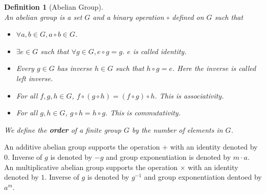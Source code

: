 \documentclass[12pt]{article}
\newtheorem{definition}{Definition}[section]
\theoremstyle{definition}
\begin{document}
\begin{definition}[Abelian Group]
\hfill\\\normalfont An abelian group is a set $G$ and a binary operation $\circ$ defined on $G$ such that
\begin{itemize}
  \item $\forall a, b\in G, a\circ b \in G$.
  \item $\exists e\in G$ such that $\forall g\in G, e\circ g=g$. $e$ is called identity.
  \item Every $g\in G$ has inverse $h\in G$ such that $h\circ g = e$. Here the inverse is called left inverse.
  \item For all $f,g,h\in G$, $f\circ(g\circ h)=(f\circ g)\circ h$. This is associativity.
  \item For all $g,h\in G$, $g\circ h=h\circ g$. This is commutativity.
\end{itemize}
We define the \textbf{order} of a finite group $G$ by the number of elements in $G$.
\end{definition}

An additive abelian group supports the operation $+$ with an identity denoted by $0$. Inverse of $g$ is denoted by $-g$ and group exponentiation is denoted by $m\cdot a$.\\
An multiplicative abelian group supports the operation $\times$ with an identity denoted by $1$. Inverse of $g$ is denoted by $g^{-1}$ and group exponentiation dentoed by $a^m$.
\end{document}
